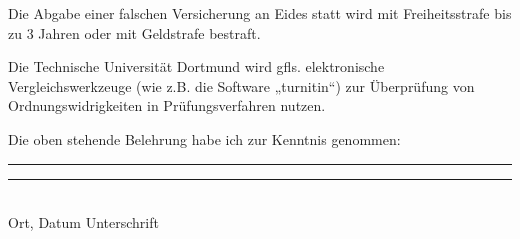 Die Abgabe einer falschen Versicherung an Eides statt wird mit Freiheitsstrafe bis zu 3 Jahren
oder mit Geldstrafe bestraft.

Die Technische Universit\"at Dortmund wird gfls. elektronische
Vergleichswerkzeuge (wie z.B. die Software „turnitin“) zur \"Uberpr\"ufung von
Ordnungswidrigkeiten in Pr\"ufungsverfahren nutzen.

Die oben stehende Belehrung habe ich zur Kenntnis genommen:
~\\

\noindent \rule{5cm}{0.4pt}   \hspace{3.5cm} \noindent \rule{6cm}{0.4pt}  \\
      {Ort, Datum}    \hspace{6.5cm} {Unterschrift}  \vspace{0.2cm}
